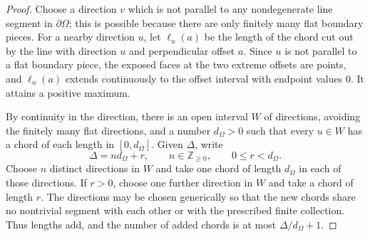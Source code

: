 \documentclass[11pt]{article}
\theoremstyle{definition}
\newcommand{\Z}{\mathbb Z}
\begin{document}
\begin{proof}
Choose a direction $v$ which is not parallel to any nondegenerate line segment in $\partial\Omega$; this is possible because there are only finitely many flat boundary pieces.  For a nearby direction $u$, let $\ell_u(a)$ be the length of the chord cut out by the line with direction $u$ and perpendicular offset $a$.  Since $u$ is not parallel to a flat boundary piece, the exposed faces at the two extreme offsets are points, and $\ell_u(a)$ extends continuously to the offset interval with endpoint values $0$.  It attains a positive maximum.

\bigskip
\noindent
By continuity in the direction, there is an open interval $W$ of directions, avoiding the finitely many flat directions, and a number $d_\Omega>0$ such that every $u\in W$ has a chord of each length in $[0,d_\Omega]$.  Given $\Delta$, write
\[
        \Delta=nd_\Omega+r,
        \qquad
        n\in\Z_{\ge0},
        \qquad
        0\le r<d_\Omega.
\]
Choose $n$ distinct directions in $W$ and take one chord of length $d_\Omega$ in each of those directions.  If $r>0$, choose one further direction in $W$ and take a chord of length $r$.  The directions may be chosen generically so that the new chords share no nontrivial segment with each other or with the prescribed finite collection.  Thus lengths add, and the number of added chords is at most $\Delta/d_\Omega+1$.
\end{proof}
\end{document}
